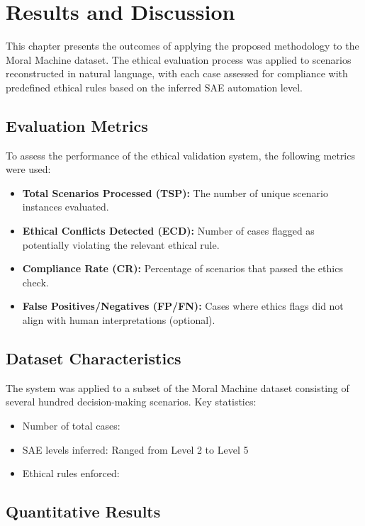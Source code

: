 \chapter{Results and Discussion}

This chapter presents the outcomes of applying the proposed methodology to the Moral Machine dataset. The ethical evaluation process was applied to scenarios reconstructed in natural language, with each case assessed for compliance with predefined ethical rules based on the inferred SAE automation level.

\section{Evaluation Metrics}

To assess the performance of the ethical validation system, the following metrics were used:

\begin{itemize}
    \item \textbf{Total Scenarios Processed (TSP):} The number of unique scenario instances evaluated.
    \item \textbf{Ethical Conflicts Detected (ECD):} Number of cases flagged as potentially violating the relevant ethical rule.
    \item \textbf{Compliance Rate (CR):} Percentage of scenarios that passed the ethics check.
    \item \textbf{False Positives/Negatives (FP/FN):} Cases where ethics flags did not align with human interpretations (optional).
\end{itemize}

\section{Dataset Characteristics}

The system was applied to a subset of the Moral Machine dataset consisting of several hundred decision-making scenarios. Key statistics:

\begin{itemize}
    \item Number of total cases: 
    \item SAE levels inferred: Ranged from Level 2 to Level 5
    \item Ethical rules enforced: 
\end{itemize}

\section{Quantitative Results}

